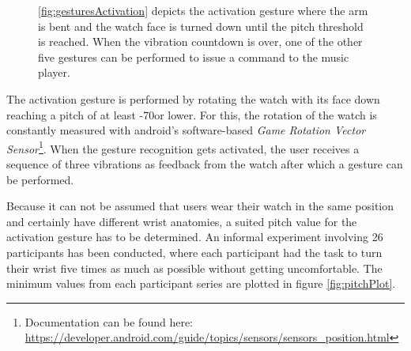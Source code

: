 \begin{figure}[Hbt]
	 \quad
	\caption{\ref{fig:gesturesActivation} depicts the activation gesture where the arm is bent and the watch face is turned down until the pitch threshold is reached. When the vibration countdown is over, one of the other five gestures can be performed to issue a command to the music player.}
	\label{fig:gestures}
\end{figure}

The activation gesture is performed by rotating the watch with its face down reaching a pitch of at least -70\textdegree or lower. For this, the rotation of the watch is constantly measured with android's software-based \textit{Game Rotation Vector Sensor}\footnote{Documentation can be found here: \url{https://developer.android.com/guide/topics/sensors/sensors_position.html}}. When the gesture recognition gets activated, the user receives a sequence of three vibrations as feedback from the watch after which a gesture can be performed.

Because it can not be assumed that users wear their watch in the same position and certainly have different wrist anatomies, a suited pitch value for the activation gesture has to be determined. An informal experiment involving 26 participants has been conducted, where each participant had the task to turn their wrist five times as much as possible without getting uncomfortable. The minimum values from each participant series are plotted in figure \ref{fig:pitchPlot}.

